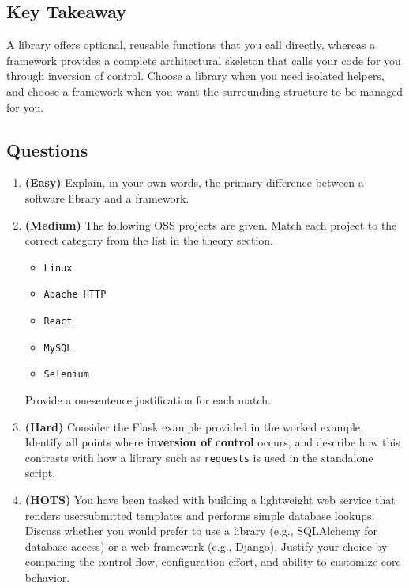 \documentclass[12pt, a4paper]{article}
\begin{document}
\subsection{Key Takeaway}
A library offers optional, reusable functions that you call directly, whereas a framework provides a complete architectural skeleton that calls your code for you through inversion of control.  Choose a library when you need isolated helpers, and choose a framework when you want the surrounding structure to be managed for you.

\subsection*{Questions}
\begin{enumerate}
    \item \textbf{(Easy)}  
    Explain, in your own words, the primary difference between a software library and a framework.  
    \newpage
    
    \item \textbf{(Medium)}  
    The following OSS projects are given.  Match each project to the correct category from the list in the theory section.  
    \begin{itemize}
        \item \texttt{Linux}
        \item \texttt{Apache HTTP}
        \item \texttt{React}
        \item \texttt{MySQL}
        \item \texttt{Selenium}
    \end{itemize}  
    Provide a onesentence justification for each match.  
    \newpage
    
    \item \textbf{(Hard)}  
    Consider the Flask example provided in the worked example.  Identify all points where \textbf{inversion of control} occurs, and describe how this contrasts with how a library such as \texttt{requests} is used in the standalone script.  
    \newpage
    
    \item \textbf{(HOTS)}  
    You have been tasked with building a lightweight web service that renders usersubmitted templates and performs simple database lookups.  Discuss whether you would prefer to use a library (e.g., SQLAlchemy for database access) or a web framework (e.g., Django).  Justify your choice by comparing the control flow, configuration effort, and ability to customize core behavior.  
    \newpage
\end{enumerate}
\end{document}
